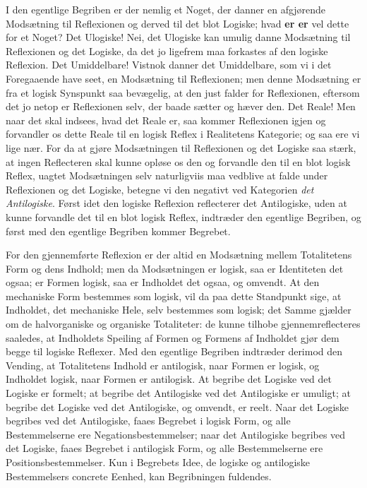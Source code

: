 \documentclass[11pt]{book}
\newcommand{\opage}[1]{\marginnote{\footnotesize\textit{[#1]}}}
\begin{document}
I den egentlige Begriben er der nemlig et Noget, der danner en afgjørende
Modsætning til Reflexionen og derved til det blot Logiske; hvad
\textbf{er er} vel dette for et Noget? Det
\opage{145} \setcounter{footnote}{0}%
Ulogiske! Nei, det Ulogiske kan umulig danne Modsætning til Reflexionen og
det Logiske, da det jo ligefrem maa forkastes af den logiske Reflexion.
Det Umiddelbare! Vistnok danner det Umiddelbare, som vi i det Foregaaende
have seet, en Modsætning til Reflexionen; men denne Modsætning er fra et
logisk Synspunkt saa bevægelig, at den just falder for Reflexionen,
eftersom det jo netop er Reflexionen selv, der baade sætter og hæver den.
Det Reale! Men naar det skal indsees, hvad det Reale er, saa kommer
Reflexionen igjen og forvandler os dette Reale til en logisk Reflex i
Realitetens Kategorie; og saa ere vi lige nær. For da at gjøre
Modsætningen til Reflexionen og det Logiske saa stærk, at ingen
Reflecteren skal kunne opløse os den og forvandle den til en blot logisk
Reflex, uagtet Modsætningen selv naturligviis maa vedblive at falde under
Reflexionen og det Logiske, betegne vi den negativt ved Kategorien
\emph{det Antilogiske}. Først idet den logiske Reflexion reflecterer det
Antilogiske, uden at kunne forvandle det til en blot logisk Reflex,
indtræder den egentlige Begriben, og først med den egentlige Begriben
kommer Begrebet.

For den gjennemførte Reflexion er der altid en Modsætning mellem
Totalitetens Form og dens Indhold; men da Modsætningen er logisk, saa er
Identiteten det ogsaa; er Formen logisk, saa er Indholdet det ogsaa, og
omvendt. At den mechaniske Form bestemmes som logisk, vil da paa dette
Standpunkt sige, at Indholdet, det mechaniske Hele, selv bestemmes som
logisk; det Samme gjælder om de halvorganiske og organiske Totaliteter: de
kunne tilhobe gjennemreflecteres saaledes, at Indholdets Speiling af
Formen og Formens af Indholdet gjør dem begge til logiske Reflexer. Med
den egentlige Begriben indtræder derimod den Vending, at Totalitetens
Indhold er antilogisk, naar Formen er logisk, og Indholdet logisk, naar
Formen er antilogisk. At begribe det Logiske ved det Logiske er formelt;
at begribe det Antilogiske
\opage{146} \setcounter{footnote}{0}%
ved det Antilogiske er umuligt; at begribe det Logiske ved det
Antilogiske, og omvendt, er reelt. Naar det Logiske begribes ved det
Antilogiske, faaes Begrebet i logisk Form, og alle Bestemmelserne ere
Negationsbestemmelser; naar det Antilogiske begribes ved det Logiske,
faaes Begrebet i antilogisk Form, og alle Bestemmelserne ere
Positionsbestemmelser. Kun i Begrebets Idee, de logiske og antilogiske
Bestemmelsers concrete Eenhed, kan Begribningen fuldendes.
\end{document}
